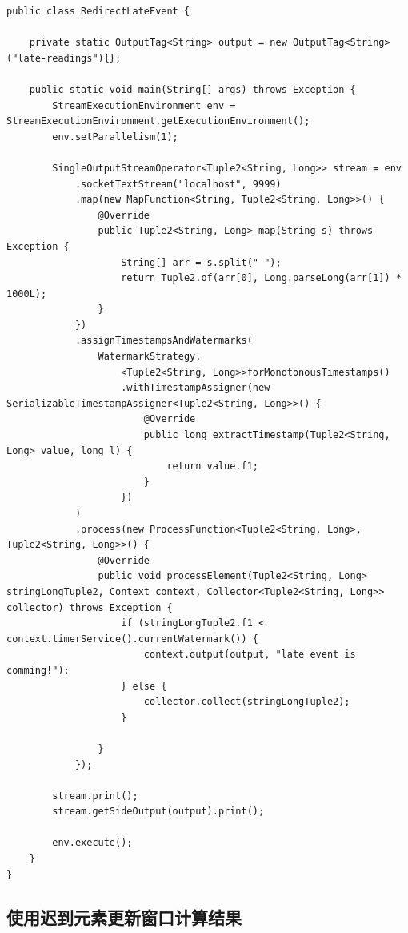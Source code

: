 \documentclass[cn,11pt,chinese]{elegantbook}
\begin{document}
\begin{verbatim}
public class RedirectLateEvent {

    private static OutputTag<String> output = new OutputTag<String>("late-readings"){};

    public static void main(String[] args) throws Exception {
        StreamExecutionEnvironment env = StreamExecutionEnvironment.getExecutionEnvironment();
        env.setParallelism(1);

        SingleOutputStreamOperator<Tuple2<String, Long>> stream = env
            .socketTextStream("localhost", 9999)
            .map(new MapFunction<String, Tuple2<String, Long>>() {
                @Override
                public Tuple2<String, Long> map(String s) throws Exception {
                    String[] arr = s.split(" ");
                    return Tuple2.of(arr[0], Long.parseLong(arr[1]) * 1000L);
                }
            })
            .assignTimestampsAndWatermarks(
                WatermarkStrategy.
                    <Tuple2<String, Long>>forMonotonousTimestamps()
                    .withTimestampAssigner(new SerializableTimestampAssigner<Tuple2<String, Long>>() {
                        @Override
                        public long extractTimestamp(Tuple2<String, Long> value, long l) {
                            return value.f1;
                        }
                    })
            )
            .process(new ProcessFunction<Tuple2<String, Long>, Tuple2<String, Long>>() {
                @Override
                public void processElement(Tuple2<String, Long> stringLongTuple2, Context context, Collector<Tuple2<String, Long>> collector) throws Exception {
                    if (stringLongTuple2.f1 < context.timerService().currentWatermark()) {
                        context.output(output, "late event is comming!");
                    } else {
                        collector.collect(stringLongTuple2);
                    }

                }
            });

        stream.print();
        stream.getSideOutput(output).print();

        env.execute();
    }
}
\end{verbatim}

\subsection{使用迟到元素更新窗口计算结果}
\end{document}
